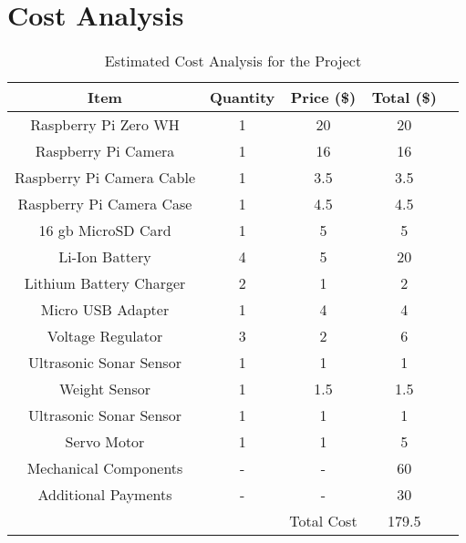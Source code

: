 \section{Cost Analysis} \label{sec:cost}

\begin{center}
\begin{table} [h!]
\centering
\begin{tabular}{ |c|c|c|c|c| } 
\hline
Item & Quantity & Price (\$) & Total (\$) \\
\hline
Raspberry Pi Zero WH & 1 & 20 & 20 \\
\hline
Raspberry Pi Camera & 1 & 16 & 16 \\
\hline
Raspberry Pi Camera Cable & 1 & 3.5 & 3.5 \\
\hline
Raspberry Pi Camera Case & 1 & 4.5 & 4.5 \\
\hline
16 gb MicroSD Card  & 1 & 5 & 5 \\
\hline
Li-Ion Battery & 4 & 5 & 20 \\ 
\hline
Lithium Battery Charger & 2 & 1 & 2 \\ 
\hline
Micro USB Adapter & 1 & 4 & 4 \\ 
\hline
Voltage Regulator & 3 & 2 & 6 \\ 
\hline
Ultrasonic Sonar Sensor & 1 & 1 & 1 \\ 
\hline
Weight Sensor & 1 & 1.5 & 1.5 \\ 
\hline
Ultrasonic Sonar Sensor & 1 & 1 & 1 \\ 
\hline
Servo Motor & 1 & 1 & 5 \\ 
\hline
Mechanical Components & - & - & 60 \\ 
\hline
Additional Payments & - & - & 30 \\ 
\hline
 & & Total Cost & 179.5 \\ 
\hline
\end{tabular}
\caption{Estimated Cost Analysis for the Project}
\label{table:costanalysis}
\end{table}
\end{center}



